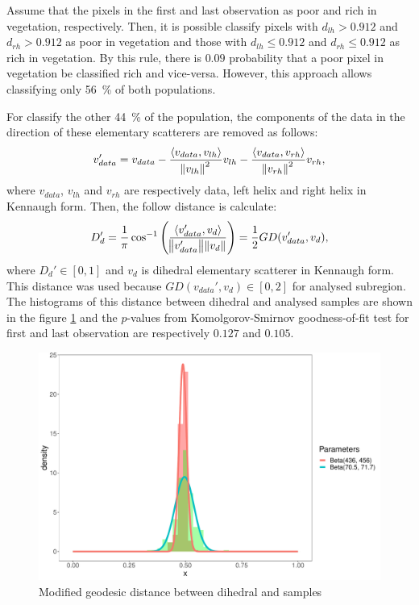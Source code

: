 \documentclass[12pt]{article}
\begin{document}
Assume that the pixels in the first and last observation as poor and rich in vegetation, respectively. 
Then, it is possible classify pixels with $d_{lh} > 0.912$ and $d_{rh} > 0.912$ as poor in vegetation and those with $d_{lh} \le 0.912$ and $d_{rh} \le 0.912$ as rich in vegetation. 
By this rule, there is $0.09$ probability that a poor pixel in vegetation be classified rich and vice-versa. 
However, this approach allows classifying only \SI{56}{\percent} of both populations.

For classify the other \SI{44}{\percent} of the population, the components of the data in the direction of these elementary scatterers are removed as follows:
\begin{equation}
  v_{data}' =  v_{data} - \frac{\langle v_{data}, v_{lh} \rangle}{\norm{v_{lh}}^2} v_{lh} - \frac{\langle v_{data}, v_{rh} \rangle}{\norm{v_{rh}}^2} v_{rh},
\end{equation}
where $v_{data}$, $v_{lh}$ and $v_{rh}$ are respectively data, left helix and right helix in Kennaugh form. Then, the follow distance is calculate:
\begin{equation}
  D_{d}' = \frac{1}{\pi} \cos^{-1}\left(\frac{\langle v_{data}', v_d \rangle}{\norm{v_{data}'}\norm{v_d}}\right) = \frac{1}{2}GD(v_{data}', v_d),
\end{equation}
where $D_d' \in [0, 1]$ and $v_d$ is dihedral elementary scatterer in Kennaugh form. This distance was used because $GD(v_{data}', v_d) \in [0, 2]$ for analysed subregion. The histograms of this distance between dihedral and analysed samples are shown in the figure \ref{fig:hist_di} and the $p$-values from Komolgorov-Smirnov goodness-of-fit test for first and last observation are respectively $0.127$ and $0.105$. 
\begin{figure}[hbt]
  \centering
  \includegraphics[width = .5\linewidth]{Histograms/hist_mod_di}
  \caption{Modified geodesic distance between dihedral and samples}
  \label{fig:hist_di}
\end{figure}
\end{document}
